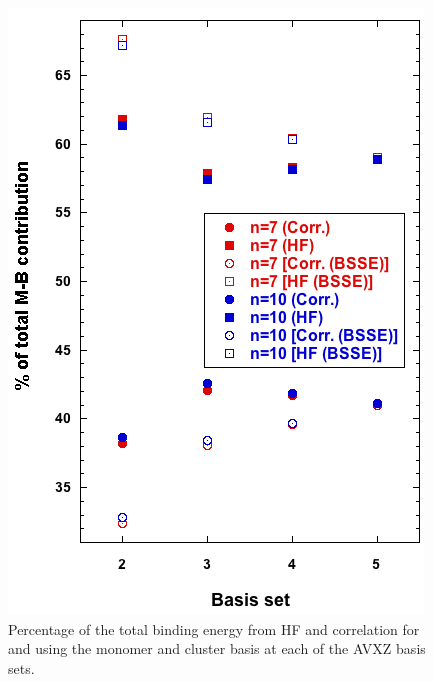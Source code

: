 \documentclass [11pt, proquest] {uwthesis}[2020/02/24]
\begin{document}
\begin{figure}[t]
\uwsinglespace
\begin{center}
\includegraphics[width=\textwidth]{Figures/Chapter_2/percent_corr_HF_7_10.jpg}
\end{center}
\label{fig:MBE_I_F8}
\caption[temp]{Percentage of the total binding energy from HF and correlation for  and  using the monomer and cluster basis at each of the AVXZ basis sets.}
\end{figure}
\end{document}
